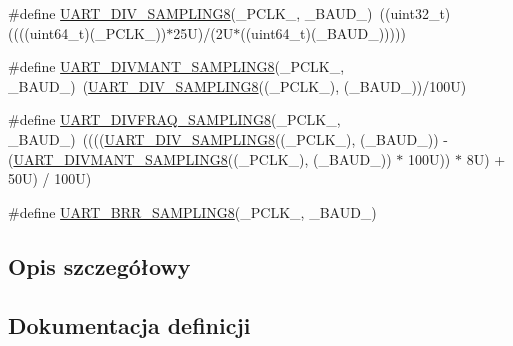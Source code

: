 \begin{DoxyCompactItemize}
\item 
\#define \hyperlink{group___u_a_r_t___private___macros_ga97075bc06a62c182b0b9a00bbf04b170}{U\+A\+R\+T\+\_\+\+D\+I\+V\+\_\+\+S\+A\+M\+P\+L\+I\+N\+G8}(\+\_\+\+P\+C\+L\+K\+\_\+,  \+\_\+\+B\+A\+U\+D\+\_\+)~((uint32\+\_\+t)((((uint64\+\_\+t)(\+\_\+\+P\+C\+L\+K\+\_\+))$\ast$25\+U)/(2\+U$\ast$((uint64\+\_\+t)(\+\_\+\+B\+A\+U\+D\+\_\+)))))
\item 
\#define \hyperlink{group___u_a_r_t___private___macros_ga3dafeed17fc4cf319b0dd88d7d0fb614}{U\+A\+R\+T\+\_\+\+D\+I\+V\+M\+A\+N\+T\+\_\+\+S\+A\+M\+P\+L\+I\+N\+G8}(\+\_\+\+P\+C\+L\+K\+\_\+,  \+\_\+\+B\+A\+U\+D\+\_\+)~(\hyperlink{group___u_a_r_t___private___macros_ga97075bc06a62c182b0b9a00bbf04b170}{U\+A\+R\+T\+\_\+\+D\+I\+V\+\_\+\+S\+A\+M\+P\+L\+I\+N\+G8}((\+\_\+\+P\+C\+L\+K\+\_\+), (\+\_\+\+B\+A\+U\+D\+\_\+))/100\+U)
\item 
\#define \hyperlink{group___u_a_r_t___private___macros_gae0c8a28dbc006a93dd8e90e8ff8a37a0}{U\+A\+R\+T\+\_\+\+D\+I\+V\+F\+R\+A\+Q\+\_\+\+S\+A\+M\+P\+L\+I\+N\+G8}(\+\_\+\+P\+C\+L\+K\+\_\+,  \+\_\+\+B\+A\+U\+D\+\_\+)~((((\hyperlink{group___u_a_r_t___private___macros_ga97075bc06a62c182b0b9a00bbf04b170}{U\+A\+R\+T\+\_\+\+D\+I\+V\+\_\+\+S\+A\+M\+P\+L\+I\+N\+G8}((\+\_\+\+P\+C\+L\+K\+\_\+), (\+\_\+\+B\+A\+U\+D\+\_\+)) -\/ (\hyperlink{group___u_a_r_t___private___macros_ga3dafeed17fc4cf319b0dd88d7d0fb614}{U\+A\+R\+T\+\_\+\+D\+I\+V\+M\+A\+N\+T\+\_\+\+S\+A\+M\+P\+L\+I\+N\+G8}((\+\_\+\+P\+C\+L\+K\+\_\+), (\+\_\+\+B\+A\+U\+D\+\_\+)) $\ast$ 100\+U)) $\ast$ 8\+U) + 50\+U) / 100\+U)
\item 
\#define \hyperlink{group___u_a_r_t___private___macros_gae36ed9e94681494a31a9d8a7bbcc1a2c}{U\+A\+R\+T\+\_\+\+B\+R\+R\+\_\+\+S\+A\+M\+P\+L\+I\+N\+G8}(\+\_\+\+P\+C\+L\+K\+\_\+,  \+\_\+\+B\+A\+U\+D\+\_\+)
\end{DoxyCompactItemize}


\subsection{Opis szczegółowy}


\subsection{Dokumentacja definicji}
\mbox{\label{group___u_a_r_t___private___macros_ga2c4dce8c60f202455e6f1481fc441f98}} 
